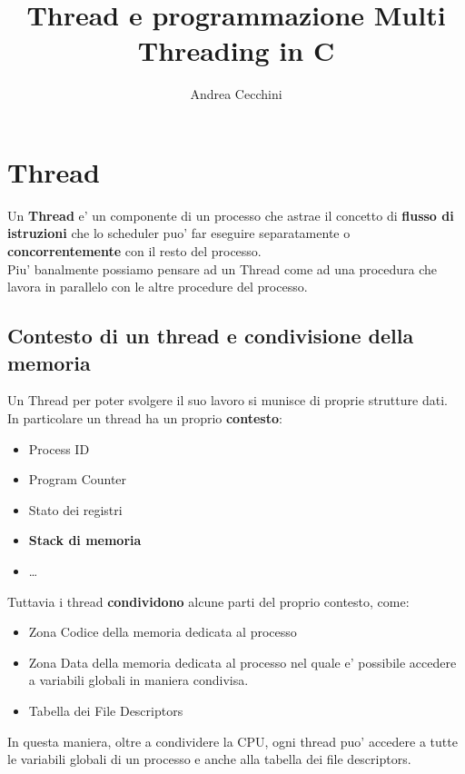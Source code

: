 \documentclass{article}
\title{Thread e programmazione Multi Threading in C}
\author{Andrea Cecchini}
\begin{document}
    \maketitle
    \section{Thread}
    Un \textbf{Thread} e' un componente di un processo che astrae
    il concetto di \textbf{flusso di istruzioni} che lo scheduler puo'
    far eseguire separatamente o \textbf{concorrentemente} con il resto
    del processo.
    \\ 
    Piu' banalmente possiamo pensare ad un Thread come ad una procedura
    che lavora in parallelo con le altre procedure del processo.
    
    \subsection{Contesto di un thread e condivisione della memoria}
    Un Thread per poter svolgere il suo lavoro si munisce di proprie 
    strutture dati.
    \\
    In particolare un thread ha un proprio \textbf{contesto}:
    \begin{itemize}
        \item Process ID
        \item Program Counter
        \item Stato dei registri
        \item \textbf{Stack di memoria}
        \item \dots
    \end{itemize} 
    Tuttavia i thread \textbf{condividono} alcune parti del proprio
    contesto, come:
    \begin{itemize}
        \item Zona Codice della memoria dedicata al processo
        \item Zona Data della memoria dedicata al processo nel quale e' 
        possibile accedere a variabili globali in maniera condivisa.
        \item Tabella dei File Descriptors
    \end{itemize}
    In questa maniera, oltre a condividere la CPU, ogni thread puo'
    accedere a tutte le variabili globali di un processo e anche alla
    tabella dei file descriptors.
\end{document}
